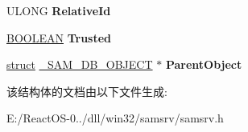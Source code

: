 \begin{DoxyCompactItemize}
\mbox{\label{struct___s_a_m___d_b___o_b_j_e_c_t_a88942e93583fa21aee75343d1b086f46}} 
U\+L\+O\+NG {\bfseries Relative\+Id}
\item 
\mbox{\label{struct___s_a_m___d_b___o_b_j_e_c_t_a738e75d1f12e93ac98d3992e8d2a2cf0}} 
\hyperlink{_processor_bind_8h_a112e3146cb38b6ee95e64d85842e380a}{B\+O\+O\+L\+E\+AN} {\bfseries Trusted}
\item 
\mbox{\label{struct___s_a_m___d_b___o_b_j_e_c_t_adc47ac1af4aee971181f452610c4a828}} 
\hyperlink{interfacestruct}{struct} \hyperlink{struct___s_a_m___d_b___o_b_j_e_c_t}{\+\_\+\+S\+A\+M\+\_\+\+D\+B\+\_\+\+O\+B\+J\+E\+CT} $\ast$ {\bfseries Parent\+Object}
\end{DoxyCompactItemize}


该结构体的文档由以下文件生成\+:\begin{DoxyCompactItemize}
\item 
E\+:/\+React\+O\+S-\/0../dll/win32/samsrv/samsrv.\+h\end{DoxyCompactItemize}
